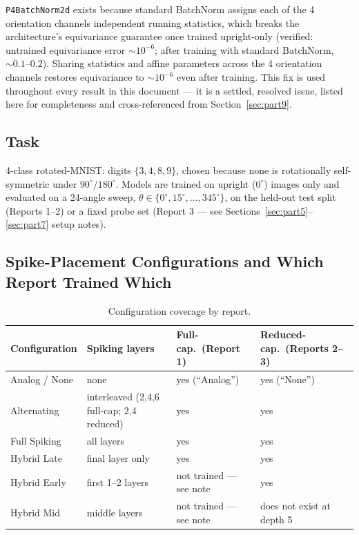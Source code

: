 \documentclass[11pt]{article}
\begin{document}
\begin{keypoint}
\texttt{P4BatchNorm2d} exists because standard BatchNorm assigns each of the 4 orientation channels
independent running statistics, which breaks the architecture's equivariance guarantee once trained
upright-only (verified: untrained equivariance error $\sim 10^{-6}$; after training with standard
BatchNorm, $\sim 0.1$--$0.2$). Sharing statistics and affine parameters across the 4 orientation channels
restores equivariance to $\sim 10^{-6}$ even after training. This fix is used throughout every result in
this document --- it is a settled, resolved issue, listed here for completeness and cross-referenced
from Section~\ref{sec:part9}.
\end{keypoint}

\subsection{Task}
4-class rotated-MNIST: digits $\{3,4,8,9\}$, chosen because none is rotationally self-symmetric under
$90^\circ/180^\circ$. Models are trained on upright ($0^\circ$) images only and evaluated on a 24-angle
sweep, $\theta \in \{0^\circ, 15^\circ, \ldots, 345^\circ\}$, on the held-out test split (Reports 1--2)
or a fixed probe set (Report 3 --- see Sections~\ref{sec:part5}--\ref{sec:part7} setup notes).

\subsection{Spike-Placement Configurations and Which Report Trained Which}

\begin{table}[H]
\centering
\small
\begin{tabular}{@{}llll@{}}
\toprule
\textbf{Configuration} & \textbf{Spiking layers} & \textbf{Full-cap.\ (Report 1)} & \textbf{Reduced-cap.\ (Reports 2--3)} \\
\midrule
Analog / None & none & yes (``Analog'') & yes (``None'') \\
Alternating & interleaved (2,4,6 full-cap; 2,4 reduced) & yes & yes \\
Full Spiking & all layers & yes & yes \\
Hybrid Late & final layer only & yes & yes \\
Hybrid Early & first 1--2 layers & not trained --- see note & yes \\
Hybrid Mid & middle layers & not trained --- see note & does not exist at depth 5 \\
\bottomrule
\end{tabular}
\caption{Configuration coverage by report.}
\end{table}
\end{document}

